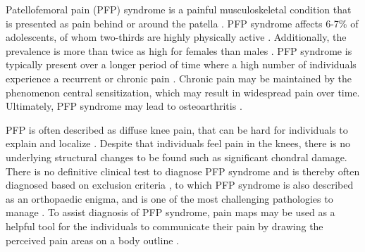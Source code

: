 Patellofemoral pain (PFP) syndrome is a painful musculoskeletal condition that is presented as pain behind or around the patella \citep{Maclachlan2017, Smith2015}. PFP syndrome affects 6-7\% of adolescents, of whom two-thirds are highly physically active \citep{Rathleff2015}. Additionally, the prevalence is more than twice as high for females than males \citep{Rathleff2015, Petersen2013}.
PFP syndrome is typically present over a longer period of time where a high number of individuals experience a recurrent or chronic pain \citep{Witvrouw2014}. Chronic pain may be maintained by the phenomenon central sensitization, which may result in widespread pain over time. Ultimately, PFP syndrome may lead to osteoarthritis \citep{Petersen2013, Crossley2016}. 

\noindent
PFP is often described as diffuse knee pain, that can be hard for individuals to explain and localize \citep{Witvrouw2014}. Despite that individuals feel pain in the knees, there is no underlying structural changes to be found such as significant chondral damage. There is no definitive clinical test to diagnose PFP syndrome and is thereby often diagnosed based on exclusion criteria \citep{Petersen2013}, to which PFP syndrome is also described as an orthopaedic enigma, and is one of the most challenging pathologies to manage \citep{Dye2001}.
To assist diagnosis of PFP syndrome, pain maps may be used as a helpful tool for the individuals to communicate their pain by drawing the perceived pain areas on a body outline \citep{Boudreau2016}.


